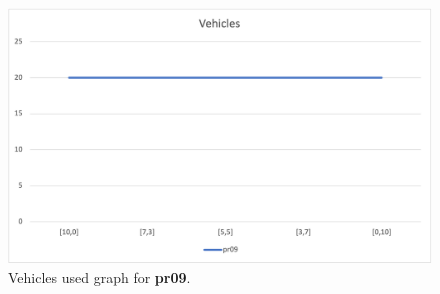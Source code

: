 \begin{figure}[H]
    \centering
    \includegraphics[height=0.25\textheight]{../graphs/pr09-vehicles.png}
    \caption{Vehicles used graph for \textbf{pr09}.}
\end{figure}

\newpage